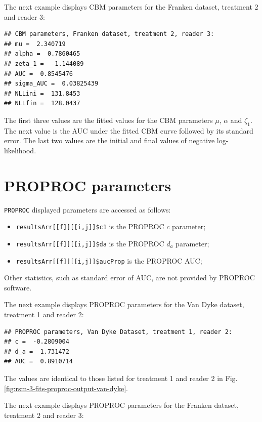 \documentclass[
]{book}
\providecommand{\tightlist}{%
  \setlength{\itemsep}{0pt}\setlength{\parskip}{0pt}}
\begin{document}
The next example displays CBM parameters for the Franken dataset, treatment 2 and reader 3:

\begin{verbatim}
## CBM parameters, Franken dataset, treatment 2, reader 3: 
## mu =  2.340719 
## alpha =  0.7860465 
## zeta_1 =  -1.144089 
## AUC =  0.8545476 
## sigma_AUC =  0.03825439 
## NLLini =  131.8453 
## NLLfin =  128.0437
\end{verbatim}

The first three values are the fitted values for the CBM parameters \(\mu\), \(\alpha\) and \(\zeta_1\). The next value is the AUC under the fitted CBM curve followed by its standard error. The last two values are the initial and final values of negative log-likelihood.

\hypertarget{rsm-3-fits-proproc-parameters}{%
\section{PROPROC parameters}\label{rsm-3-fits-proproc-parameters}}

\texttt{PROPROC} displayed parameters are accessed as follows:

\begin{itemize}
\tightlist
\item
  \texttt{resultsArr{[}{[}f{]}{]}{[}{[}i,j{]}{]}\$c1} is the PROPROC \(c\) parameter;
\item
  \texttt{resultsArr{[}{[}f{]}{]}{[}{[}i,j{]}{]}\$da} is the PROPROC \(d_a\) parameter;\\
\item
  \texttt{resultsArr{[}{[}f{]}{]}{[}{[}i,j{]}{]}\$aucProp} is the PROPROC AUC;
\end{itemize}

Other statistics, such as standard error of AUC, are not provided by PROPROC software.

The next example displays PROPROC parameters for the Van Dyke dataset, treatment 1 and reader 2:

\begin{verbatim}
## PROPROC parameters, Van Dyke Dataset, treatment 1, reader 2: 
## c =  -0.2809004 
## d_a =  1.731472 
## AUC =  0.8910714
\end{verbatim}

The values are identical to those listed for treatment 1 and reader 2 in Fig. \ref{fig:rsm-3-fits-proproc-output-van-dyke}.

The next example displays PROPROC parameters for the Franken dataset, treatment 2 and reader 3:
\end{document}
